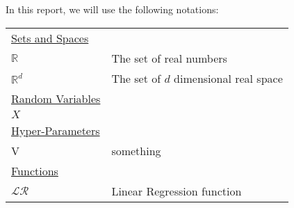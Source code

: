 In this report, we will use the following notations:

\begin{table}[h]
\begin{tabularx}{\textwidth}{@{}XX@{}}
\toprule
  \underline{Sets and Spaces} \\
  $\mathbb{R}$ & The set of real numbers \\
  $\mathbb{R}^d$ & The set of $d$ dimensional real space \\
  \underline{Random Variables} \\
  $X$ & \\	
  \underline{Hyper-Parameters} \\
  V   & something \\
  \underline{Functions} \\
  $\mathcal{LR}$ & Linear Regression function\\
\bottomrule
\end{tabularx}
\end{table}
